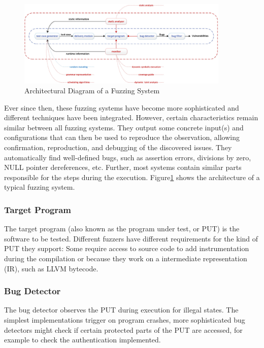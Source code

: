 \documentclass{article}
\begin{document}
\begin{multicols}{2}
    \begin{figure}[!tp]
        \centering
        \includegraphics[width=0.9\textwidth]{assets/FuzzingSteps.jpg}
        \caption{Architectural Diagram of a Fuzzing System\cite{Science}}
        \label{fig:FuzzingSteps}
    \end{figure}

    Ever since then, these fuzzing systems have become more sophisticated and different techniques have been integrated. However, certain characteristics remain similar between all fuzzing systems. They output some concrete input(s) and configurations that can then be used to reproduce the observation, allowing confirmation, reproduction, and debugging of the discovered issues.\cite{EvaluatingFuzzTesting} They automatically find well-defined bugs, such as assertion errors, divisions by zero, NULL pointer dereferences, etc.\cite{AllYouEverWanted} Further, most systems contain similar parts responsible for the steps during the execution. Figure\ref{fig:FuzzingSteps} shows the architecture of a typical fuzzing system.

    \subsubsection{Target Program}
    The target program (also known as the program under test, or PUT) is the software to be tested. Different fuzzers have different requirements for the kind of PUT they support: Some require access to source code to add instrumentation during the compilation or because they work on a intermediate representation (IR), such as LLVM bytecode.

    \subsubsection{Bug Detector}
    The bug detector observes the PUT during execution for illegal states. The simplest implementations trigger on program crashes, more sophisticated bug detectors might check if certain protected parts of the PUT are accessed, for example to check the authentication implemented.


\end{multicols}
\end{document}
